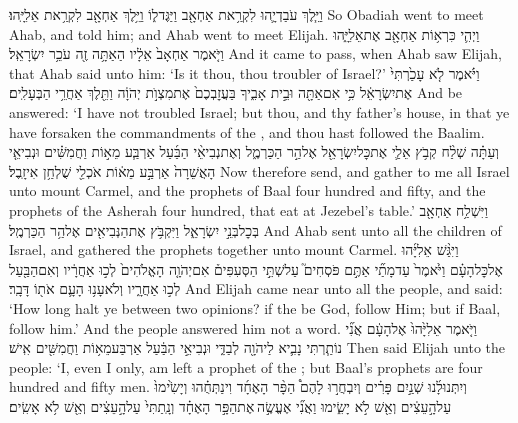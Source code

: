 {וַיֵּ֧לֶךְ עֹבַדְיָ֛הוּ לִקְרַ֥את אַחְאָ֖ב וַיַּגֶּד\maqqaf ל֑וֹ וַיֵּ֥לֶךְ אַחְאָ֖ב לִקְרַ֥את אֵלִיָּֽהוּ׃}
{So Obadiah went to meet Ahab, and told him; and Ahab went to meet Elijah.}
{וַיְהִ֛י כִּרְא֥וֹת אַחְאָ֖ב אֶת\maqqaf אֵלִיָּ֑הוּ וַיֹּ֤אמֶר אַחְאָב֙ אֵלָ֔יו הַאַתָּ֥ה זֶ֖ה עֹכֵ֥ר יִשְׂרָאֵֽל׃}
{And it came to pass, when Ahab saw Elijah, that Ahab said unto him: ‘Is it thou, thou troubler of Israel?’}
{וַיֹּ֗אמֶר לֹ֤א עָכַ֙רְתִּי֙ אֶת\maqqaf יִשְׂרָאֵ֔ל כִּ֥י אִם\maqqaf אַתָּ֖ה וּבֵ֣ית אָבִ֑יךָ בַּעֲזׇבְכֶם֙ אֶת\maqqaf מִצְוֺ֣ת יְהֹוָ֔ה וַתֵּ֖לֶךְ אַחֲרֵ֥י הַבְּעָלִֽים׃}
{And be answered: ‘I have not troubled Israel; but thou, and thy father’s house, in that ye have forsaken the commandments of the \lord, and thou hast followed the Baalim.}
{וְעַתָּ֗ה שְׁלַ֨ח קְבֹ֥ץ אֵלַ֛י אֶת\maqqaf כׇּל\maqqaf יִשְׂרָאֵ֖ל אֶל\maqqaf הַ֣ר הַכַּרְמֶ֑ל וְאֶת\maqqaf נְבִיאֵ֨י הַבַּ֜עַל אַרְבַּ֧ע מֵא֣וֹת וַחֲמִשִּׁ֗ים וּנְבִיאֵ֤י הָאֲשֵׁרָה֙ אַרְבַּ֣ע מֵא֔וֹת אֹכְלֵ֖י שֻׁלְחַ֥ן אִיזָֽבֶל׃}
{Now therefore send, and gather to me all Israel unto mount Carmel, and the prophets of Baal four hundred and fifty, and the prophets of the Asherah four hundred, that eat at Jezebel’s table.’}
{וַיִּשְׁלַ֥ח אַחְאָ֖ב בְּכׇל\maqqaf בְּנֵ֣י יִשְׂרָאֵ֑ל וַיִּקְבֹּ֥ץ אֶת\maqqaf הַנְּבִיאִ֖ים אֶל\maqqaf הַ֥ר הַכַּרְמֶֽל׃}
{And Ahab sent unto all the children of Israel, and gathered the prophets together unto mount Carmel.}
{וַיִּגַּ֨שׁ אֵלִיָּ֜הוּ אֶל\maqqaf כׇּל\maqqaf הָעָ֗ם וַיֹּ֙אמֶר֙ עַד\maqqaf מָתַ֞י אַתֶּ֣ם פֹּסְחִים֮ עַל\maqqaf שְׁתֵּ֣י הַסְּעִפִּים֒ אִם\maqqaf יְהֹוָ֤ה הָאֱלֹהִים֙ לְכ֣וּ אַחֲרָ֔יו וְאִם\maqqaf הַבַּ֖עַל לְכ֣וּ אַחֲרָ֑יו וְלֹא\maqqaf עָנ֥וּ הָעָ֛ם אֹת֖וֹ דָּבָֽר׃}
{And Elijah came near unto all the people, and said: ‘How long halt ye between two opinions? if the \lord\space be God, follow Him; but if Baal, follow him.’ And the people answered him not a word.}
{וַיֹּ֤אמֶר אֵלִיָּ֙הוּ֙ אֶל\maqqaf הָעָ֔ם אֲנִ֞י נוֹתַ֧רְתִּי נָבִ֛יא לַיהֹוָ֖ה לְבַדִּ֑י וּנְבִיאֵ֣י הַבַּ֔עַל אַרְבַּע\maqqaf מֵא֥וֹת וַחֲמִשִּׁ֖ים אִֽישׁ׃}
{Then said Elijah unto the people: ‘I, even I only, am left a prophet of the \lord; but Baal’s prophets are four hundred and fifty men.}
{וְיִתְּנוּ\maqqaf לָ֜נוּ שְׁנַ֣יִם פָּרִ֗ים וְיִבְחֲר֣וּ לָהֶם֩ הַפָּ֨ר הָאֶחָ֜ד וִינַתְּחֻ֗הוּ וְיָשִׂ֙ימוּ֙ עַל\maqqaf הָ֣עֵצִ֔ים וְאֵ֖שׁ לֹ֣א יָשִׂ֑ימוּ וַאֲנִ֞י אֶעֱשֶׂ֣ה \legarmeh  אֶת\maqqaf הַפָּ֣ר הָאֶחָ֗ד וְנָֽתַתִּי֙ עַל\maqqaf הָ֣עֵצִ֔ים וְאֵ֖שׁ לֹ֥א אָשִֽׂים׃}
